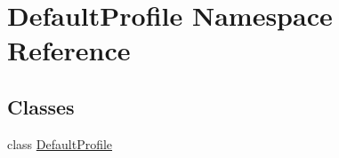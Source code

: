 \hypertarget{namespaceDefaultProfile}{\section{Default\-Profile Namespace Reference}
\label{namespaceDefaultProfile}
}
\subsection*{Classes}
\begin{DoxyCompactItemize}
\item 
class \hyperlink{classDefaultProfile_1_1DefaultProfile}{Default\-Profile}
\end{DoxyCompactItemize}
